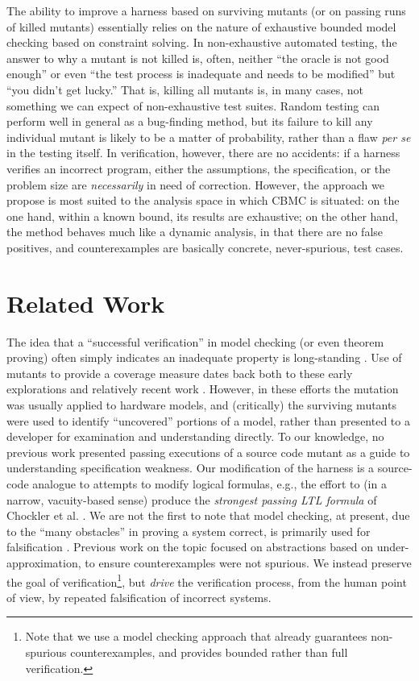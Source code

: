 \documentclass[conference]{IEEEtran}
\begin{document}
The ability to improve a harness based on surviving mutants (or on
passing runs of killed mutants) essentially relies on the nature of
exhaustive bounded model checking based on constraint solving.  In
non-exhaustive automated testing, the answer to why a mutant is not
killed is, often, neither ``the oracle is not good enough'' or even
``the test process is inadequate and needs to be modified'' but ``you
didn't get lucky.''  That is, killing all mutants is, in many cases,
not something we can expect of non-exhaustive test suites.  Random
testing \cite{HamletOnly,ICSEDiff} can perform well in general as a
bug-finding method, but its failure to kill any individual mutant is
likely to be a matter of probability, rather than a flaw \emph{per se}
in the testing itself.  In verification, however, there are no
accidents: if a harness verifies an incorrect program, either the
assumptions, the specification, or the problem size are \emph{necessarily} in
need of correction.  However, the approach we propose is most suited
to the analysis space in which CBMC is situated: on the one hand,
within a known bound, its results are exhaustive; on the other hand,
the method behaves much like a dynamic analysis, in that there are no
false positives, and counterexamples are basically concrete,
never-spurious, test cases.

\section{Related Work}

The idea that a ``successful verification'' in model checking (or even
theorem proving) often simply indicates an inadequate property is
long-standing \cite{PracticalCov,Hoskote}. Use of mutants
\cite{MutSpec,MutCov} to provide a coverage measure dates back both to
these early explorations and relatively recent work \cite{MutInterp}.
However, in these efforts the mutation was usually applied to hardware
models, and (critically) the surviving mutants were used to identify
``uncovered'' portions of a model, rather than presented to a
developer for examination and understanding directly.  To our
knowledge, no previous work presented passing executions of a source
code mutant as a guide to understanding specification weakness.  Our
modification of the harness is a source-code analogue to attempts to
modify logical formulas, e.g., the effort to (in a narrow,
vacuity-based sense) produce the \emph{strongest passing LTL formula}
of Chockler et al. \cite{BeyondVac}.  We are not the first to note
that model checking, at present, due to the ``many obstacles'' in
proving a system correct, is primarily used for falsification
\cite{AbsFals}.  Previous work on the topic \cite{AbsFals} focused on
abstractions based on under-approximation, to ensure counterexamples
were not spurious. We instead preserve the goal of
verification\footnote{Note that we use a model checking approach that
  already guarantees non-spurious counterexamples, and provides
  bounded rather than full verification.}, but \emph{drive} the verification
process, from the human point of view, by repeated falsification of
incorrect systems.
\end{document}
